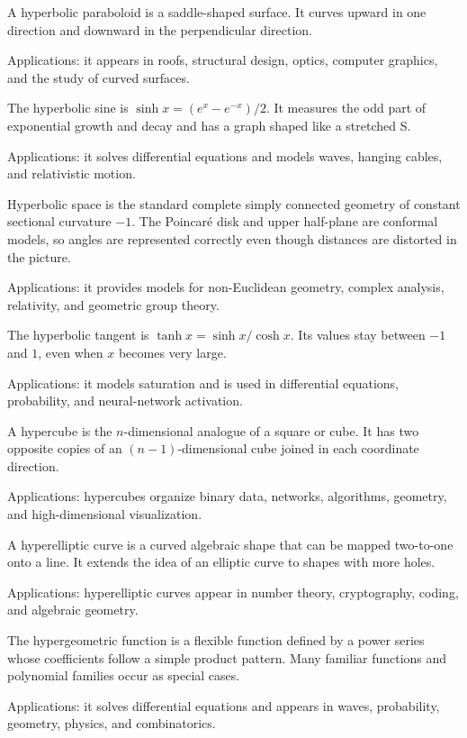 A hyperbolic paraboloid is a saddle-shaped surface. It curves upward in one direction and downward in the perpendicular direction. \par\noindent Applications: it appears in roofs, structural design, optics, computer graphics, and the study of curved surfaces.

The hyperbolic sine is $\sinh x=(e^x-e^{-x})/2$. It measures the odd part of exponential growth and decay and has a graph shaped like a stretched S. \par\noindent Applications: it solves differential equations and models waves, hanging cables, and relativistic motion.

Hyperbolic space is the standard complete simply connected geometry of constant sectional curvature $-1$. The Poincaré disk and upper half-plane are conformal models, so angles are represented correctly even though distances are distorted in the picture. \par\noindent Applications: it provides models for non-Euclidean geometry, complex analysis, relativity, and geometric group theory.

The hyperbolic tangent is $\tanh x=\sinh x/\cosh x$. Its values stay between $-1$ and $1$, even when $x$ becomes very large. \par\noindent Applications: it models saturation and is used in differential equations, probability, and neural-network activation.

A hypercube is the $n$-dimensional analogue of a square or cube. It has two opposite copies of an $(n-1)$-dimensional cube joined in each coordinate direction. \par\noindent Applications: hypercubes organize binary data, networks, algorithms, geometry, and high-dimensional visualization.

A hyperelliptic curve is a curved algebraic shape that can be mapped two-to-one onto a line. It extends the idea of an elliptic curve to shapes with more holes. \par\noindent Applications: hyperelliptic curves appear in number theory, cryptography, coding, and algebraic geometry.

The hypergeometric function is a flexible function defined by a power series whose coefficients follow a simple product pattern. Many familiar functions and polynomial families occur as special cases. \par\noindent Applications: it solves differential equations and appears in waves, probability, geometry, physics, and combinatorics.

